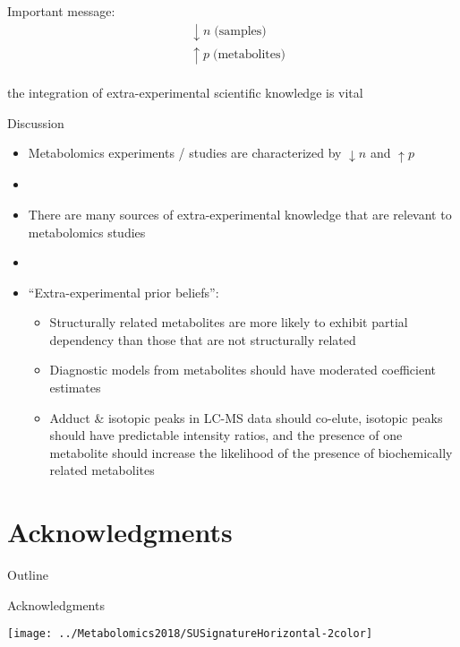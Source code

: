 \documentclass[xcolor=dvipsnames]{beamer}
\begin{document}
\begin{frame}{}{}
\vspace{-15pt}
{\Huge
	Important message:
	\begin{align*}
	&\downarrow n \; \text{(samples)} \\
	&\uparrow p  \; \text{(metabolites)}
	\end{align*}} \pause 
{\LARGE \\the integration of extra-experimental scientific knowledge is vital}
\end{frame}

\begin{frame}{Discussion}
	\vspace{-10.5pt}
	\begin{itemize}
		\item Metabolomics experiments / studies are characterized by $\downarrow n$ and $\uparrow p$ \pause
		\item[]
		\item There are many sources of extra-experimental knowledge that are relevant to metabolomics studies \pause
		\item[] 
		\item ``Extra-experimental prior beliefs'': \pause
		\begin{itemize}
			\item Structurally related metabolites are more likely to exhibit partial dependency than those that are not structurally related \pause
			\item Diagnostic models from metabolites should have moderated coefficient estimates \pause
			\item Adduct \& isotopic peaks in LC-MS data should co-elute, isotopic peaks should have predictable intensity ratios, and the presence of one metabolite should increase the likelihood of the presence of biochemically related metabolites
		\end{itemize}
	\end{itemize}
\end{frame}

\section{Acknowledgments}
\begin{frame}{Outline}
	\vspace{-10.5pt}
	\tableofcontents[currentsection,subsectionstyle=hide]
\end{frame}

\begin{frame}{Acknowledgments}
	\vspace{-15.5pt}
	\begin{center}
		\texttt{[image: ../Metabolomics2018/SUSignatureHorizontal-2color]}
	\end{center}
\end{frame}
\end{document}
